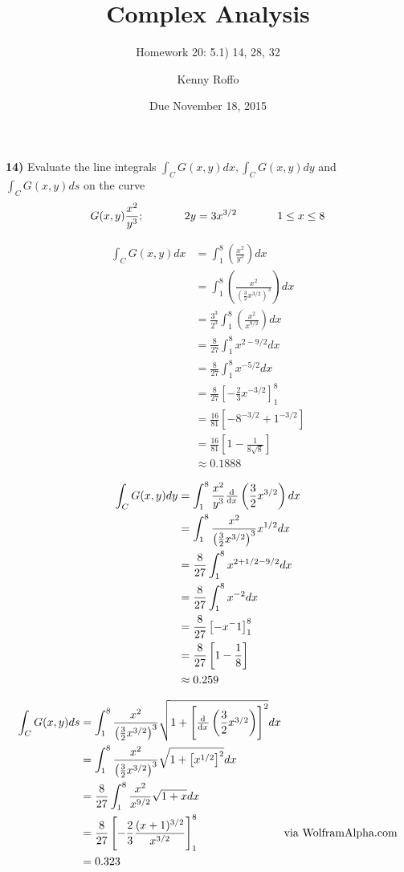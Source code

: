 \documentclass{scrartcl}
\title{Complex Analysis}
\subtitle{Homework 20: 5.1) 14, 28, 32}
\author{Kenny Roffo}
\date{Due November 18, 2015}
\begin{document}
\maketitle

\textbf{14)} Evaluate the line integrals $\int_CG(x,y)dx, \int_CG(x,y)dy$ and $\int_CG(x,y)ds$ on the curve 
$$G(x,y)\frac{x^2}{y^3}; \text{\hspace{0.5in}} 2y=3x^{3/2} \text{\hspace{0.5in}} 1\le x\le8$$

\begin{align*}
  \int_CG(x,y)dx &= \int_1^8\left(\frac{x^2}{y^3}\right)dx\\
  &= \int_1^8\left(\frac{x^2}{\left(\frac{3}{2}x^{3/2}\right)^3}\right)dx\\
  &= \frac{3^3}{2^3}\int_1^8\left(\frac{x^2}{x^{9/2}}\right)dx\\
  &= \frac{8}{27}\int_1^8x^{2-9/2}dx\\
  &= \frac{8}{27}\int_1^8x^{-5/2}dx\\
  &= \frac{8}{27}\left[-\frac{2}{3}x^{-3/2}\right]_1^8\\
  &= \frac{16}{81}\left[-8^{-3/2} + 1^{-3/2}\right]\\
  &= \frac{16}{81}\left[1 - \frac{1}{8\sqrt{8}}\right]\\
  &\approx 0.1888
\end{align*}\pagebreak

\begin{align*}
  \int_CG(x,y)dy &= \int_1^8\frac{x^2}{y^3}\od{}{x}\left(\frac{3}{2}x^{3/2}\right)dx\\
  &= \int_1^8\frac{x^2}{\left(\frac{3}{2}x^{3/2}\right)^3}x^{1/2}dx\\
  &= \frac{8}{27}\int_1^8x^{2+1/2-9/2}dx\\
  &= \frac{8}{27}\int_1^8x^{-2}dx\\
  &= \frac{8}{27}\left[-x^-1\right]_1^8\\
  &= \frac{8}{27}\left[1 - \frac{1}{8}\right]\\
  &\approx 0.259
\end{align*}

\begin{align*}
  \int_CG(x,y)ds &= \int_1^8\frac{x^2}{\left(\frac{3}{2}x^{3/2}\right)^3}\sqrt{1+\left[\od{}{x}\left(\frac{3}{2}x^{3/2}\right)\right]^2}dx\\
  &= \int_1^8\frac{x^2}{\left(\frac{3}{2}x^{3/2}\right)^3}\sqrt{1+\left[x^{1/2}\right]^2}dx\\
  &= \frac{8}{27}\int_1^8\frac{x^2}{x^{9/2}}\sqrt{1+x}dx\\
  &= \frac{8}{27}\left[-\frac{2}{3}\frac{(x+1)^{3/2}}{x^{3/2}}\right]_1^8 \text{\hspace{1in} via WolframAlpha.com}\\
  &= 0.323
\end{align*}\pagebreak
\end{document}
